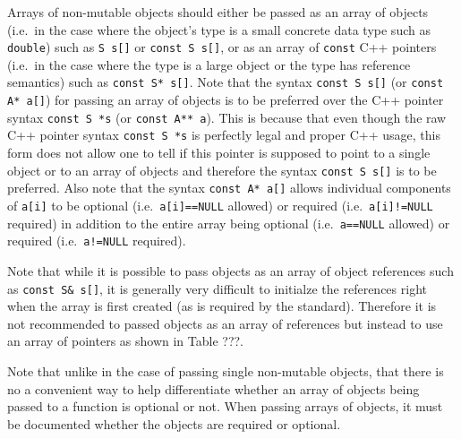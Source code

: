 Arrays of non-mutable objects should either be passed as an array of
objects (i.e.~in the case where the object's type is a small concrete
data type such as {}\texttt{double}) such as {}\texttt{S s[]} or
{}\texttt{const S s[]}, or as an array of {}\texttt{const} C++
pointers (i.e.~in the case where the type is a large object or the
type has reference semantics) such as {}\texttt{const S* s[]}.  Note
that the syntax {}\texttt{const S s[]} (or {}\texttt{const A* a[]})
for passing an array of objects is to be preferred over the C++
pointer syntax {}\texttt{const S *s} (or {}\texttt{const A** a}).
This is because that even though the raw C++ pointer syntax
{}\texttt{const S *s} is perfectly legal and proper C++ usage, this
form does not allow one to tell if this pointer is supposed to point
to a single object or to an array of objects and therefore the syntax
{}\texttt{const S s[]} is to be preferred.  Also note that the syntax
{}\texttt{const A* a[]} allows individual components of
{}\texttt{a[i]} to be optional (i.e.~{}\texttt{a[i]==NULL} allowed) or
required (i.e.~{}\texttt{a[i]!=NULL} required) in addition to the
entire array being optional (i.e.~{}\texttt{a==NULL} allowed) or
required (i.e.~{}\texttt{a!=NULL} required).

Note that while it is possible to pass objects as an array of object
references such as {}\texttt{const S\& s[]}, it is generally very
difficult to initialze the references right when the array is first
created (as is required by the standard).  Therefore it is not
recommended to passed objects as an array of references but instead to
use an array of pointers as shown in Table ???.

Note that unlike in the case of passing single non-mutable objects,
that there is no a convenient way to help differentiate whether an
array of objects being passed to a function is optional or not.  When
passing arrays of objects, it must be documented whether the objects
are required or optional.

